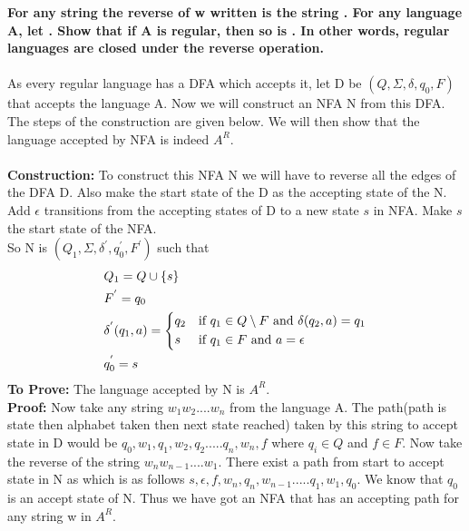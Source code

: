 \documentclass{article}
\begin{document}
\textbf{For any string  the reverse of w written  is the string 
. For any language A, let . Show that if A is regular,
 then so is . In other words, regular languages are closed under the reverse operation.}\\
\\
As every regular language has a DFA which accepts it, let D be $(Q, \Sigma, \delta, q_0, F )$ that accepts the language
 A. Now we will construct an NFA N from this DFA. The steps of the construction are given below. We will then show that 
 the language accepted by NFA is indeed $A^R$.\\
\\
\textbf{Construction:} To construct this NFA N we will have to reverse all the edges of the DFA D. Also make the start 
state of the D as the accepting state of the N. Add $\epsilon$ transitions from the accepting states of D to a new state 
$s$ in NFA. Make $s$ the start state of the NFA.\\
So N is $(Q_1, \Sigma, \delta^{'}, q_0^{'} , F^{'} )$ such that
\begin{equation}
\begin{split}
&            Q_1=Q\cup\{s\}\\
&           F^{'}=q_0\\
&           \delta^{'}(q_1,a) = 
            \begin{cases*}
            q_2 & if $q_1 \in Q \setminus F$  and  $\delta(q_2,a)=q_1$\\
            s       & if $ q_1 \in F$ and $a=\epsilon$
            \end{cases*}\\
&           q_0^{'}=s \\
\end{split}
\end{equation}
\textbf{To Prove:} The language accepted by N is $A^R$.\\
\textbf{Proof:} Now take any string $w_1 w_2....w_n$ from the language A. The path(path is state then alphabet taken then
 next state reached) taken by this string to accept state in D would be $q_0,w_1,q_1,w_2,q_2.....q_n,w_n,f$ where $q_i\in
  Q$ and $f\in F$. Now take the reverse of the string $w_n w_{n-1}....w_1$. There exist a path from start to accept state 
  in N as which is as follows $s,\epsilon,f,w_n,q_n,w_{n-1}.....q_1,w_1,q_0$. We know that $q_0$ is an accept state of N.
  Thus we have got an NFA that has an accepting path for any string w in $A^R$.\\
\end{document}
